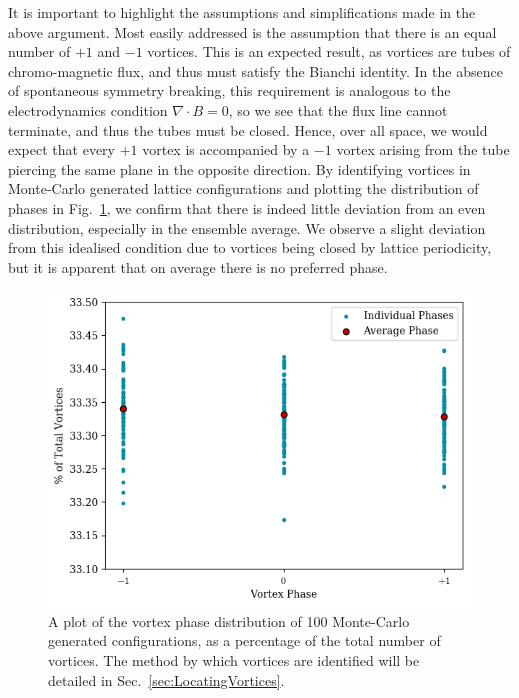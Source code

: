 It is important to highlight the assumptions and simplifications made in the above argument. Most easily addressed is the assumption that there is an equal number of $+1$ and $-1$ vortices. This is an expected result, as vortices are tubes of chromo-magnetic flux, and thus must satisfy the Bianchi identity. In the absence of spontaneous symmetry breaking, this requirement is analogous to the electrodynamics condition $\nabla \cdot B = 0$, so we see that the flux line cannot terminate, and thus the tubes must be closed. Hence, over all space, we would expect that every $+1$ vortex is accompanied by a $-1$ vortex arising from the tube piercing the same plane in the opposite direction. By identifying vortices in Monte-Carlo generated lattice configurations and plotting the distribution of phases in Fig.~\ref{fig:VortexDistribution}, we confirm that there is indeed little deviation from an even distribution, especially in the ensemble average. We observe a slight deviation from this idealised condition due to vortices being closed by lattice periodicity, but it is apparent that on average there is no preferred phase.\\
%
\begin{figure}[htb!]
\includegraphics{./VortexDistribution.png}
\caption[A plot of the vortex phase distribution of 100 Monte-Carlo generated configurations.]{\label{fig:VortexDistribution}A plot of the vortex phase distribution of 100 Monte-Carlo generated configurations, as a percentage of the total number of vortices. The method by which vortices are identified will be detailed in Sec.~\ref{sec:LocatingVortices}.}
\end{figure}
%

